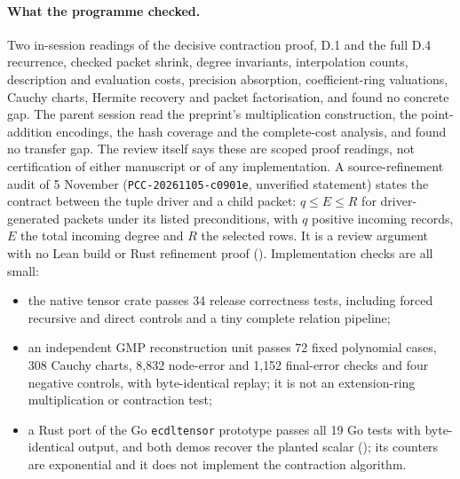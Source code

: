 \paragraph{What the programme checked.} Two in-session readings of the
decisive contraction proof, D.1 and the full D.4 recurrence, checked packet
shrink, degree invariants, interpolation counts, description and evaluation
costs, precision absorption, coefficient-ring valuations, Cauchy charts,
Hermite recovery and packet factorisation, and found no concrete gap. The
parent session read the preprint's multiplication construction, the
point-addition encodings, the hash coverage and the complete-cost analysis,
and found no transfer gap. The review itself says these are scoped proof
readings, not certification of either manuscript or of any implementation.
A source-refinement audit of 5 November (\texttt{PCC-20261105-c0901e},
unverified statement) states the contract between the tuple driver and a
child packet: $q\le E\le R$ for driver-generated packets under its listed
preconditions, with $q$ positive incoming records, $E$ the total incoming
degree and $R$ the selected rows. It is a review argument with no Lean build
or Rust refinement proof
().
Implementation checks are all small:
\begin{itemize}
\item the native tensor crate passes 34 release correctness tests,
  including forced recursive and direct controls and a tiny complete
  relation pipeline;
\item an independent GMP reconstruction unit passes 72 fixed polynomial
  cases, 308 Cauchy charts, 8{,}832 node-error and 1{,}152 final-error checks
  and four negative controls, with byte-identical replay; it is not an
  extension-ring multiplication or contraction test;
\item a Rust port of the Go \texttt{ecdltensor} prototype passes all 19 Go
  tests with byte-identical output, and both demos recover the planted
  scalar (); its counters
  are exponential and it does not implement the contraction algorithm.
\end{itemize}

